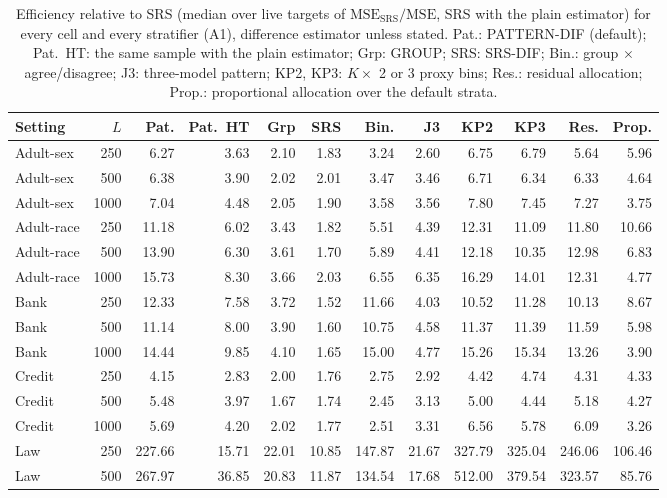 \documentclass[pdflatex,sn-mathphys-num,iicol]{sn-jnl}
\theoremstyle{thmstyleone}
\theoremstyle{thmstyletwo}
\theoremstyle{thmstylethree}
\begin{document}
\begin{table}[t]
\centering\scriptsize
\caption{Efficiency relative to SRS (median over live targets of $\mathrm{MSE}_{\mathrm{SRS}}/\mathrm{MSE}$, SRS with the plain estimator) for every cell and every stratifier (A1), difference estimator unless stated. Pat.: PATTERN-DIF (default); Pat.\ HT: the same sample with the plain estimator; Grp: GROUP; SRS: SRS-DIF; Bin.: group $\times$ agree/disagree; J3: three-model pattern; KP2, KP3: $K\times$ 2 or 3 proxy bins; Res.: residual allocation; Prop.: proportional allocation over the default strata.}
\label{tab:abl-app-eff-design}
\setlength{\tabcolsep}{3pt}
\begin{tabular}{lrrrrrrrrrrr}
\toprule
Setting & $L$ & Pat. & Pat.\ HT & Grp & SRS & Bin. & J3 & KP2 & KP3 & Res. & Prop. \\
\midrule
Adult-sex & 250 & 6.27 & 3.63 & 2.10 & 1.83 & 3.24 & 2.60 & 6.75 & 6.79 & 5.64 & 5.96 \\
Adult-sex & 500 & 6.38 & 3.90 & 2.02 & 2.01 & 3.47 & 3.46 & 6.71 & 6.34 & 6.33 & 4.64 \\
Adult-sex & 1000 & 7.04 & 4.48 & 2.05 & 1.90 & 3.58 & 3.56 & 7.80 & 7.45 & 7.27 & 3.75 \\
Adult-race & 250 & 11.18 & 6.02 & 3.43 & 1.82 & 5.51 & 4.39 & 12.31 & 11.09 & 11.80 & 10.66 \\
Adult-race & 500 & 13.90 & 6.30 & 3.61 & 1.70 & 5.89 & 4.41 & 12.18 & 10.35 & 12.98 & 6.83 \\
Adult-race & 1000 & 15.73 & 8.30 & 3.66 & 2.03 & 6.55 & 6.35 & 16.29 & 14.01 & 12.31 & 4.77 \\
Bank & 250 & 12.33 & 7.58 & 3.72 & 1.52 & 11.66 & 4.03 & 10.52 & 11.28 & 10.13 & 8.67 \\
Bank & 500 & 11.14 & 8.00 & 3.90 & 1.60 & 10.75 & 4.58 & 11.37 & 11.39 & 11.59 & 5.98 \\
Bank & 1000 & 14.44 & 9.85 & 4.10 & 1.65 & 15.00 & 4.77 & 15.26 & 15.34 & 13.26 & 3.90 \\
Credit & 250 & 4.15 & 2.83 & 2.00 & 1.76 & 2.75 & 2.92 & 4.42 & 4.74 & 4.31 & 4.33 \\
Credit & 500 & 5.48 & 3.97 & 1.67 & 1.74 & 2.45 & 3.13 & 5.00 & 4.44 & 5.18 & 4.27 \\
Credit & 1000 & 5.69 & 4.20 & 2.02 & 1.77 & 2.51 & 3.31 & 6.56 & 5.78 & 6.09 & 3.26 \\
Law & 250 & 227.66 & 15.71 & 22.01 & 10.85 & 147.87 & 21.67 & 327.79 & 325.04 & 246.06 & 106.46 \\
Law & 500 & 267.97 & 36.85 & 20.83 & 11.87 & 134.54 & 17.68 & 512.00 & 379.54 & 323.57 & 85.76 \\

\end{tabular}
\end{table}
\end{document}
